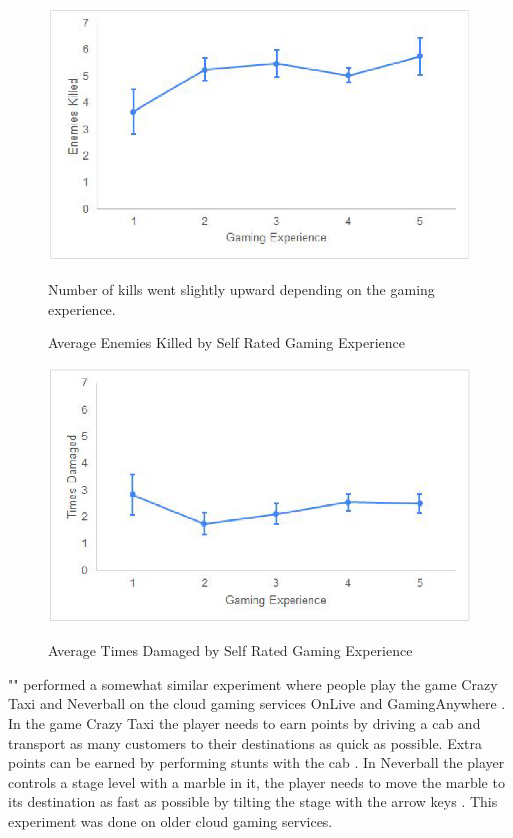 \begin{figure}[H]
	\centering
	\includegraphics[width=12cm]{../img/fig18.png}
	\caption{Average Enemies Killed by Self Rated Gaming Experience}
	Number of kills went slightly upward depending on the gaming experience.\\
	\parencite[Section 4.2.3, Page 41, Figure 18]{desveaux2020effects}
\end{figure}
\begin{figure}[H]
	\centering
	\includegraphics[width=12cm]{../img/fig19.png}
	\caption{Average Times Damaged by Self Rated Gaming Experience}
	\parencite[Section 4.2.3, Page 41, Figure 19]{desveaux2020effects}
\end{figure}
\newpage
"\textcite{claypool2014effects}" performed a somewhat similar experiment where people play the game Crazy Taxi and Neverball on the cloud gaming services OnLive and GamingAnywhere \parencite[Chapter 3]{claypool2014effects}. In the game Crazy Taxi the player needs to earn points by driving a cab and transport as many customers to their destinations as quick as possible. Extra points can be earned by performing stunts with the cab \parencite[Section 3.A]{claypool2014effects}. In Neverball the player controls a stage level with a marble in it, the player needs to move the marble to its destination as fast as possible by tilting the stage with the arrow keys \parencite[Section 3.A]{claypool2014effects}. This experiment was done on older cloud gaming services.

